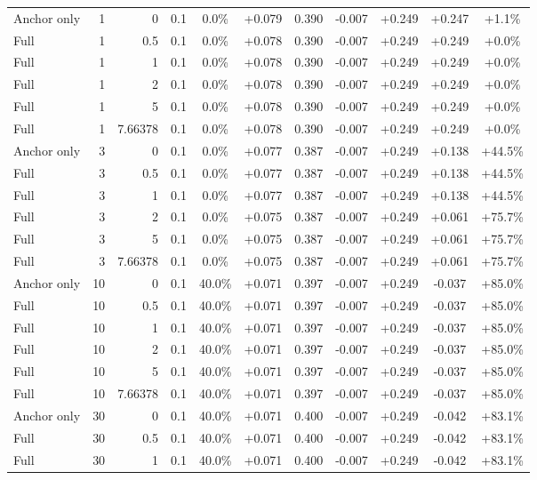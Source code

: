 \begin{table}[htbp]
\begin{tabular}{lrrrccccccc}
Anchor only & 1 & 0 & 0.1 & 0.0\% & +0.079 & 0.390 & -0.007 & +0.249 & +0.247 & +1.1\% \\
Full & 1 & 0.5 & 0.1 & 0.0\% & +0.078 & 0.390 & -0.007 & +0.249 & +0.249 & +0.0\% \\
Full & 1 & 1 & 0.1 & 0.0\% & +0.078 & 0.390 & -0.007 & +0.249 & +0.249 & +0.0\% \\
Full & 1 & 2 & 0.1 & 0.0\% & +0.078 & 0.390 & -0.007 & +0.249 & +0.249 & +0.0\% \\
Full & 1 & 5 & 0.1 & 0.0\% & +0.078 & 0.390 & -0.007 & +0.249 & +0.249 & +0.0\% \\
Full & 1 & 7.66378 & 0.1 & 0.0\% & +0.078 & 0.390 & -0.007 & +0.249 & +0.249 & +0.0\% \\
Anchor only & 3 & 0 & 0.1 & 0.0\% & +0.077 & 0.387 & -0.007 & +0.249 & +0.138 & +44.5\% \\
Full & 3 & 0.5 & 0.1 & 0.0\% & +0.077 & 0.387 & -0.007 & +0.249 & +0.138 & +44.5\% \\
Full & 3 & 1 & 0.1 & 0.0\% & +0.077 & 0.387 & -0.007 & +0.249 & +0.138 & +44.5\% \\
Full & 3 & 2 & 0.1 & 0.0\% & +0.075 & 0.387 & -0.007 & +0.249 & +0.061 & +75.7\% \\
Full & 3 & 5 & 0.1 & 0.0\% & +0.075 & 0.387 & -0.007 & +0.249 & +0.061 & +75.7\% \\
Full & 3 & 7.66378 & 0.1 & 0.0\% & +0.075 & 0.387 & -0.007 & +0.249 & +0.061 & +75.7\% \\
Anchor only & 10 & 0 & 0.1 & 40.0\% & +0.071 & 0.397 & -0.007 & +0.249 & -0.037 & +85.0\% \\
Full & 10 & 0.5 & 0.1 & 40.0\% & +0.071 & 0.397 & -0.007 & +0.249 & -0.037 & +85.0\% \\
Full & 10 & 1 & 0.1 & 40.0\% & +0.071 & 0.397 & -0.007 & +0.249 & -0.037 & +85.0\% \\
Full & 10 & 2 & 0.1 & 40.0\% & +0.071 & 0.397 & -0.007 & +0.249 & -0.037 & +85.0\% \\
Full & 10 & 5 & 0.1 & 40.0\% & +0.071 & 0.397 & -0.007 & +0.249 & -0.037 & +85.0\% \\
Full & 10 & 7.66378 & 0.1 & 40.0\% & +0.071 & 0.397 & -0.007 & +0.249 & -0.037 & +85.0\% \\
Anchor only & 30 & 0 & 0.1 & 40.0\% & +0.071 & 0.400 & -0.007 & +0.249 & -0.042 & +83.1\% \\
Full & 30 & 0.5 & 0.1 & 40.0\% & +0.071 & 0.400 & -0.007 & +0.249 & -0.042 & +83.1\% \\
Full & 30 & 1 & 0.1 & 40.0\% & +0.071 & 0.400 & -0.007 & +0.249 & -0.042 & +83.1\% \\

\end{tabular}
\end{table}
